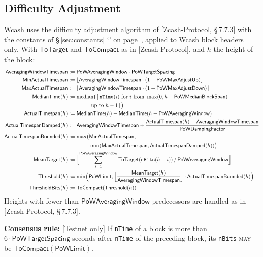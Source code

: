 \documentclass[10pt,letterpaper]{article}
\newcommand\MAY{\textsc{may}}
\newcommand\fn[1]{\mathsf{#1}}
\newcommand\secref[1]{\S\,\ref{#1} `\nameref{#1}' on page~\pageref{#1}}
\newcommand\rules[1]{\par\textbf{#1}}
\theoremstyle{plain}
\begin{document}
\subsection{Difficulty Adjustment}\label{sec:difficulty}

Wcash uses the difficulty adjustment algorithm of [Zcash-Protocol, \S\,7.7.3] with the constants of \secref{sec:constants}, applied to Wcash block headers only. With $\fn{ToTarget}$ and $\fn{ToCompact}$ as in [Zcash-Protocol], and $h$ the height of the block:
\begin{align*}
\fn{AveragingWindowTimespan} &:= \fn{PoWAveragingWindow} \cdot \fn{PoWTargetSpacing}\\
\fn{MinActualTimespan} &:= \lfloor \fn{AveragingWindowTimespan} \cdot (1 - \fn{PoWMaxAdjustUp}) \rfloor\\
\fn{MaxActualTimespan} &:= \lfloor \fn{AveragingWindowTimespan} \cdot (1 + \fn{PoWMaxAdjustDown}) \rfloor\\
\fn{MedianTime}(h) &:= \operatorname{median}\bigl(\,[\,\mathtt{nTime}(i) \text{ for } i \text{ from } \max(0, h - \fn{PoWMedianBlockSpan})\\
&\qquad\qquad \text{ up to } h - 1\,]\,\bigr)\\
\fn{ActualTimespan}(h) &:= \fn{MedianTime}(h) - \fn{MedianTime}(h - \fn{PoWAveragingWindow})\\
\fn{ActualTimespanDamped}(h) &:= \fn{AveragingWindowTimespan} + \frac{\fn{ActualTimespan}(h) - \fn{AveragingWindowTimespan}}{\fn{PoWDampingFactor}}\\
\fn{ActualTimespanBounded}(h) &:= \max\bigl(\fn{MinActualTimespan},\\
&\qquad\qquad \min(\fn{MaxActualTimespan}, \fn{ActualTimespanDamped}(h))\bigr)\\
\fn{MeanTarget}(h) &:= \Bigl\lfloor \sum_{i=1}^{\fn{PoWAveragingWindow}} \fn{ToTarget}(\mathtt{nBits}(h - i)) \,/\, \fn{PoWAveragingWindow} \Bigr\rfloor\\
\fn{Threshold}(h) &:= \min\Bigl(\fn{PoWLimit}, \Bigl\lfloor \frac{\fn{MeanTarget}(h)}{\fn{AveragingWindowTimespan}} \Bigr\rfloor \cdot \fn{ActualTimespanBounded}(h)\Bigr)\\
\fn{ThresholdBits}(h) &:= \fn{ToCompact}(\fn{Threshold}(h))
\end{align*}
Heights with fewer than $\fn{PoWAveragingWindow}$ predecessors are handled as in [Zcash-Protocol, \S\,7.7.3].

\rules{Consensus rule:} [Testnet only] If \texttt{nTime} of a block is more than $6 \cdot \fn{PoWTargetSpacing}$ seconds after \texttt{nTime} of the preceding block, its \texttt{nBits} \MAY{} be $\fn{ToCompact}(\fn{PoWLimit})$.
\end{document}

